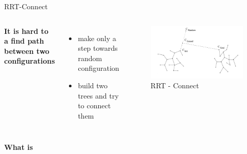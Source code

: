 \documentclass[ignorenonframetext,aspectratio=169,]{paradise-slide}
\providecommand{\tightlist}{%
  \setlength{\itemsep}{0pt}\setlength{\parskip}{0pt}}
\begin{document}
\begin{frame}[fragile]{RRT-Connect}
\protect\hypertarget{rrt-connect}{}

\begin{columns}


\textbf{It is hard to a find path between two configurations}

\begin{itemize}
\tightlist
\item
  make only a step towards random configuration
\item
  build two trees and try to connect them
\end{itemize}


\begin{figure}
\centering
\includegraphics{rrtconect.png}
\caption{RRT - Connect}
\end{figure}

\end{columns}

\pause

\textbf{What is }

\end{frame}
\end{document}
